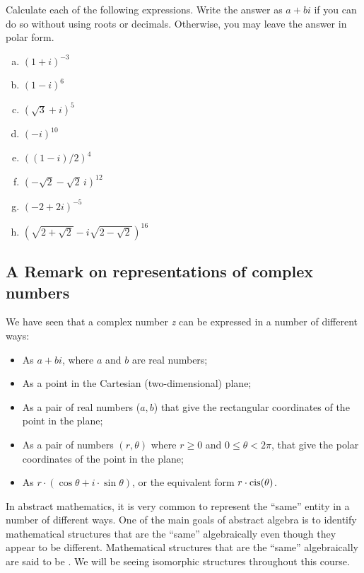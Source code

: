  

\begin{exercise}{31}
Calculate each of the following expressions. Write the answer as $a + bi$ if you can do so without using roots or decimals. Otherwise, you may leave the answer in polar form.
\begin{multicols}{2}
\begin{enumerate}[(a)]
 
 \item
$(1+i)^{-3}$
 \item
$(1 - i)^{6}$
 \item
$(\sqrt{3}+i)^{5}$
 \item
$(-i)^{10}$
 \item
$((1-i)/2)^{4}$
 \item
$(-\sqrt{2} - \sqrt{2}\, i)^{12}$
 \item
$(-2+2i)^{-5}$
\item
$(\sqrt{2 + \sqrt{2}} - i\sqrt{2 - \sqrt{2}})^{16}$
\end{enumerate}
\end{multicols}
\end{exercise}


\subsection{A Remark on representations of complex numbers}\label{remRepComplex}

We have seen that a complex number \emph{z} can be expressed in a
number of different ways: 
\begin{itemize}
\item As $a+bi$, where $a$ and $b$ are real numbers; 
\item As a point in the Cartesian (two-dimensional) plane; 
\item As a pair of real numbers ($a,b$) that give the rectangular coordinates
of the point in the plane; 
\item As a pair of numbers $(r,\theta)$ where $r\geq0$ and $0\le\theta<2\pi$,
that give the polar coordinates of the point in the plane; 
\item As $r\cdot(\cos\theta+i\cdot\sin\theta)$, or the equivalent form
$r\cdot\operatorname{cis}(\theta)$.
\end{itemize}
In abstract mathematics, it is very common to represent the ``same''
entity in a number of different ways. One of the main goals of abstract
algebra is to identify mathematical structures that are the ``same''
algebraically even though they appear to be different. Mathematical
structures that are the ``same'' algebraically are said to be
. We will be seeing isomorphic structures
throughout this course.


